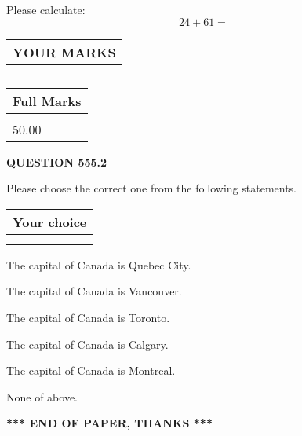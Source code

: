 \documentclass[12pt]{article}
\begin{document}
  
 
Please calculate:
\begin{equation}
24 +  %
61 = \nonumber
\end{equation}
 

 

 
  
\vspace{0.2in}
  
\noindent\begin{tabular}{|l|}
\hline
 YOUR MARKS  \\
\hline
 \\ 
 \\ 
\hline
\end{tabular}
\hspace{0.05in} \begin{tabular}{|l|}
\hline
 Full Marks  \\
\hline
 \\ 
50.00 \\
\hline
\end{tabular}
{\textbf{\Large{QUESTION
555.2 
}}}
  
  
Please choose the correct one from the following statements.
  
  
\noindent\hspace{3.0in} \begin{tabular}{|l|}
\hline
Your choice \\
\hline
 \\ 
 \\ 
\hline
\end{tabular}
  
  
 
 
The capital of Canada is Quebec City.
 
 
The capital of Canada is Vancouver.
 
 
The capital of Canada is Toronto.
 
 
The capital of Canada is Calgary.
 
 
The capital of Canada is Montreal.
 
 
 None of above.
 
 
   
   
 \vspace{0.2in}
 
   
   
   
   
\vspace{1.0in} 
{\textbf{\large{ *** END OF PAPER, THANKS *** }}} 
   
\end{document}

